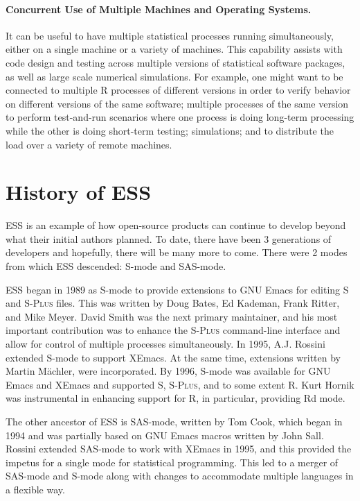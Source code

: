 \documentclass{article}
\newcommand*{\Splus}{\textsc{S-Plus}}
\begin{document}
\paragraph{Concurrent Use of Multiple Machines and Operating Systems.}
\label{sec:conc-use-mult}

It can be useful to have multiple statistical processes running
simultaneously, either on a single machine or a variety of machines.
This capability assists with code design and testing across multiple
versions of statistical software packages, as well as large scale
numerical simulations.  For example, one might want to be connected to
multiple R processes of different versions in order to verify behavior
on different versions of the same software; multiple processes of the
same version to perform test-and-run scenarios where one process is
doing long-term processing while the other is doing short-term
testing; simulations; and to distribute the load over a variety of
remote machines.

\section{History of ESS}
\label{sec:ESS:history}

ESS is an example of how open-source products can continue to
develop beyond what their initial authors planned.  To date, there have been 3
generations of developers and hopefully, there will be many more to come.
There were 2 modes from which ESS descended:  S-mode and SAS-mode.

ESS began in 1989 as S-mode to
provide extensions to GNU Emacs for editing S and \Splus{} files.  This
was written by Doug Bates, Ed Kademan, Frank Ritter, and
Mike Meyer.  David Smith was the next primary maintainer, and his most
important contribution was to enhance the \Splus{}
command-line interface and allow for control of multiple processes
simultaneously.  In 1995, A.J. Rossini extended S-mode to support
XEmacs.  At the same time, extensions written by Martin M{\"a}chler, were incorporated.
By 1996, S-mode was available for GNU Emacs and XEmacs and supported S, \Splus, and
to some extent R.  Kurt Hornik was instrumental in enhancing support
for R, in particular, providing Rd mode.

The other ancestor of ESS is SAS-mode,
written by Tom Cook, which began in 1994 and was partially based on
GNU Emacs macros written by John Sall.
Rossini extended SAS-mode to work with
XEmacs in 1995, and this provided the
impetus for a single mode for statistical programming.
This led to a merger of SAS-mode and S-mode along with changes
to accommodate multiple languages in a flexible way.
\end{document}
